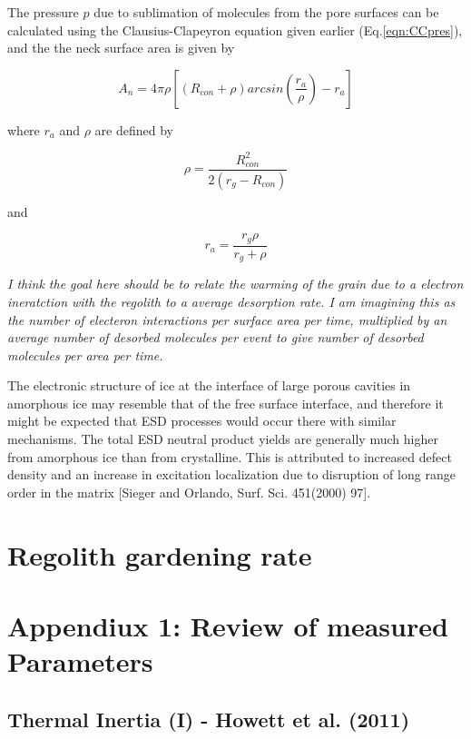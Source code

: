 \documentclass[11pt]{article} %
\begin{document}
	The pressure $p$ due to sublimation of molecules from the pore surfaces can be calculated using the Clausius-Clapeyron equation given earlier (Eq.\ref{eqn:CCpres}), and the the neck surface area is given by
	
	\begin{equation}
	A_{n} = 4\pi\rho \left[ (R_{con} + \rho)arcsin\left(\frac{r_{a}}{\rho}\right) - r_{a} \right]
	\end{equation}
	
	where $r_{a}$ and $\rho$ are defined by
	
	\begin{equation}
	\rho = \frac{R_{con}^{2}}{2(r_{g}-R_{con})}
	\end{equation}
	
	and
	
	\begin{equation}
	 r_{a} = \frac{r_{g}\rho}{r_{g}+\rho}
	\end{equation}
	
	\emph{I think the goal here should be to relate the warming of the grain due to a electron ineratction with the regolith to a average desorption rate. I am imagining this as the number of electeron interactions per surface area per time, multiplied by an average number of desorbed molecules per event to give number of desorbed molecules per area per time.}
	
	The electronic structure of ice at the interface of large porous cavities in amorphous ice may resemble that of the free surface interface, and therefore it might be expected that ESD processes would occur there with similar mechanisms. The total ESD neutral product yields are generally much higher from amorphous ice than from crystalline. This is attributed to increased defect density and an increase in excitation localization due to disruption of long range order in the matrix [Sieger and Orlando, Surf. Sci. 451(2000) 97].

\section{Regolith gardening rate}


\newpage

\section{Appendiux 1: Review of measured Parameters}
\label{sec:measured}

\subsection{Thermal Inertia (I) - Howett et al. (2011)}
\label{sec:inertia}
\end{document}
